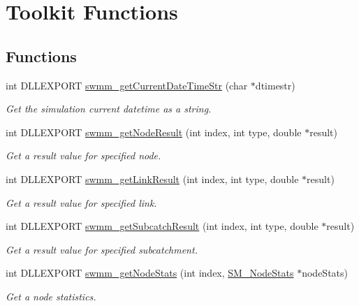 \hypertarget{group__tkfuncs}{}\section{Toolkit Functions}
\label{group__tkfuncs}
\subsection*{Functions}
\begin{DoxyCompactItemize}
\item 
int D\+L\+L\+E\+X\+P\+O\+RT \hyperlink{group__tkfuncs_ga1035b4f45546c1c90da4dafda7e3677d}{swmm\+\_\+get\+Current\+Date\+Time\+Str} (char $\ast$dtimestr)
\begin{DoxyCompactList}\small\item\em Get the simulation current datetime as a string. \end{DoxyCompactList}\item 
int D\+L\+L\+E\+X\+P\+O\+RT \hyperlink{group__tkfuncs_gacef44d121a8f9a646f4e6f108b494373}{swmm\+\_\+get\+Node\+Result} (int index, int type, double $\ast$result)
\begin{DoxyCompactList}\small\item\em Get a result value for specified node. \end{DoxyCompactList}\item 
int D\+L\+L\+E\+X\+P\+O\+RT \hyperlink{group__tkfuncs_ga578a49668d519c8b4cdcab2227f8119b}{swmm\+\_\+get\+Link\+Result} (int index, int type, double $\ast$result)
\begin{DoxyCompactList}\small\item\em Get a result value for specified link. \end{DoxyCompactList}\item 
int D\+L\+L\+E\+X\+P\+O\+RT \hyperlink{group__tkfuncs_ga32311167c22094c1eb9aa69edee29d63}{swmm\+\_\+get\+Subcatch\+Result} (int index, int type, double $\ast$result)
\begin{DoxyCompactList}\small\item\em Get a result value for specified subcatchment. \end{DoxyCompactList}\item 
int D\+L\+L\+E\+X\+P\+O\+RT \hyperlink{group__tkfuncs_ga0d52d8f1b900a0ef3d3df309c5df21f8}{swmm\+\_\+get\+Node\+Stats} (int index, \hyperlink{struct_s_m___node_stats}{S\+M\+\_\+\+Node\+Stats} $\ast$node\+Stats)
\begin{DoxyCompactList}\small\item\em Get a node statistics. \end{DoxyCompactList}\item 

\end{DoxyCompactItemize}
